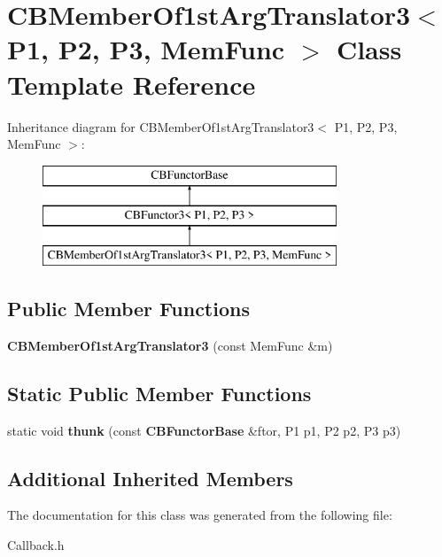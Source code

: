 \section{C\+B\+Member\+Of1st\+Arg\+Translator3$<$ P1, P2, P3, Mem\+Func $>$ Class Template Reference}
\label{classCBMemberOf1stArgTranslator3}
Inheritance diagram for C\+B\+Member\+Of1st\+Arg\+Translator3$<$ P1, P2, P3, Mem\+Func $>$\+:\begin{figure}[H]
\begin{center}
\leavevmode
\includegraphics[height=3.000000cm]{classCBMemberOf1stArgTranslator3}
\end{center}
\end{figure}
\subsection*{Public Member Functions}
\begin{DoxyCompactItemize}
\item 
{\bfseries C\+B\+Member\+Of1st\+Arg\+Translator3} (const Mem\+Func \&m)\label{classCBMemberOf1stArgTranslator3_a0d0af6a625075314d7639aa6ed40c574}

\end{DoxyCompactItemize}
\subsection*{Static Public Member Functions}
\begin{DoxyCompactItemize}
\item 
static void {\bfseries thunk} (const {\bf C\+B\+Functor\+Base} \&ftor, P1 p1, P2 p2, P3 p3)\label{classCBMemberOf1stArgTranslator3_adb8aa106ab7d055c2088cb12b01669b5}

\end{DoxyCompactItemize}
\subsection*{Additional Inherited Members}


The documentation for this class was generated from the following file\+:\begin{DoxyCompactItemize}
\item 
Callback.\+h\end{DoxyCompactItemize}
